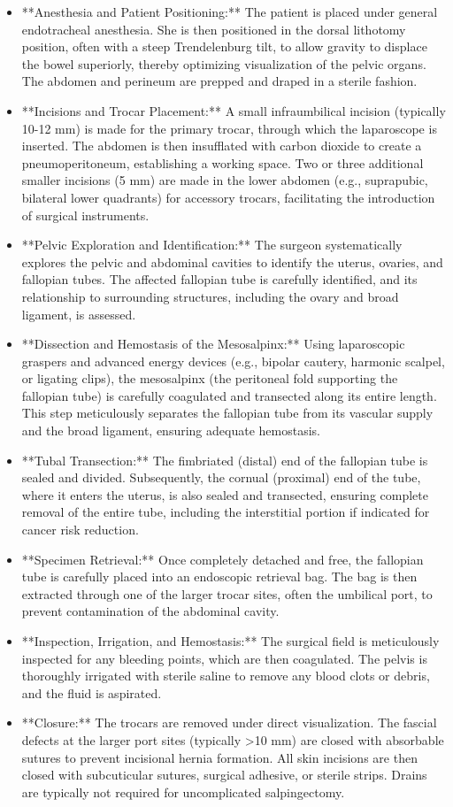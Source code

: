 \begin{itemize}
  \item **Anesthesia and Patient Positioning:** The patient is placed under general endotracheal anesthesia. She is then positioned in the dorsal lithotomy position, often with a steep Trendelenburg tilt, to allow gravity to displace the bowel superiorly, thereby optimizing visualization of the pelvic organs. The abdomen and perineum are prepped and draped in a sterile fashion.
  \item **Incisions and Trocar Placement:** A small infraumbilical incision (typically 10-12 mm) is made for the primary trocar, through which the laparoscope is inserted. The abdomen is then insufflated with carbon dioxide to create a pneumoperitoneum, establishing a working space. Two or three additional smaller incisions (5 mm) are made in the lower abdomen (e.g., suprapubic, bilateral lower quadrants) for accessory trocars, facilitating the introduction of surgical instruments.
  \item **Pelvic Exploration and Identification:** The surgeon systematically explores the pelvic and abdominal cavities to identify the uterus, ovaries, and fallopian tubes. The affected fallopian tube is carefully identified, and its relationship to surrounding structures, including the ovary and broad ligament, is assessed.
  \item **Dissection and Hemostasis of the Mesosalpinx:** Using laparoscopic graspers and advanced energy devices (e.g., bipolar cautery, harmonic scalpel, or ligating clips), the mesosalpinx (the peritoneal fold supporting the fallopian tube) is carefully coagulated and transected along its entire length. This step meticulously separates the fallopian tube from its vascular supply and the broad ligament, ensuring adequate hemostasis.
  \item **Tubal Transection:** The fimbriated (distal) end of the fallopian tube is sealed and divided. Subsequently, the cornual (proximal) end of the tube, where it enters the uterus, is also sealed and transected, ensuring complete removal of the entire tube, including the interstitial portion if indicated for cancer risk reduction.
  \item **Specimen Retrieval:** Once completely detached and free, the fallopian tube is carefully placed into an endoscopic retrieval bag. The bag is then extracted through one of the larger trocar sites, often the umbilical port, to prevent contamination of the abdominal cavity.
  \item **Inspection, Irrigation, and Hemostasis:** The surgical field is meticulously inspected for any bleeding points, which are then coagulated. The pelvis is thoroughly irrigated with sterile saline to remove any blood clots or debris, and the fluid is aspirated.
  \item **Closure:** The trocars are removed under direct visualization. The fascial defects at the larger port sites (typically >10 mm) are closed with absorbable sutures to prevent incisional hernia formation. All skin incisions are then closed with subcuticular sutures, surgical adhesive, or sterile strips. Drains are typically not required for uncomplicated salpingectomy.
\end{itemize}

